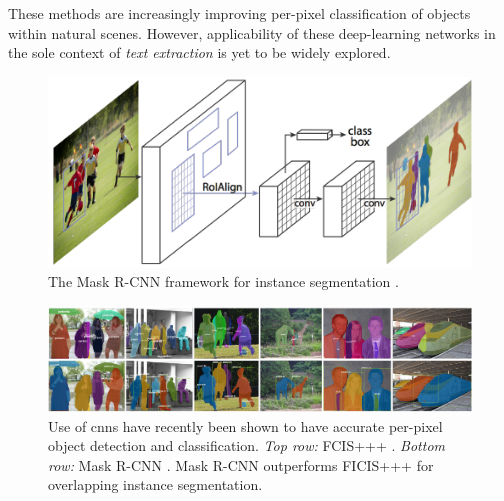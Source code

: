 These methods are increasingly improving per-pixel classification of objects within natural scenes. However, applicability of these deep-learning networks in the sole context of \textit{text extraction} is yet to be widely explored.

\begin{figure}[p]
  \centering
  \includegraphics[width=\textwidth]{images/background/he2017_maskrcnnframework}
  \caption[The Mask R-CNN framework for instance segmentation]{The Mask R-CNN framework for instance segmentation \citep{He:2017ud}.}
  \label{fig:background:detection:learning:he2017_maskrcnnframework}
\end{figure}

\begin{figure}[p]
  \centering
  \includegraphics[width=\textwidth]{images/background/he2017_maskrcnn}
  \caption[Use of CNNs for object detection]{Use of \glspl{cnn} have recently been shown to have accurate per-pixel object detection and classification. \textit{Top row:} FCIS+++ \citep{Li:2016uj}. \textit{Bottom row:} Mask R-CNN \citep{He:2017ud}. Mask R-CNN outperforms FICIS+++ for overlapping instance segmentation.}
  \label{fig:background:detection:learning:he2017_maskrcnn}
\end{figure}

\clearpage